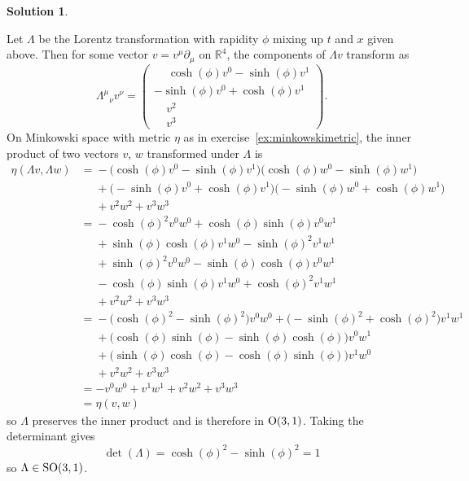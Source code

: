 \documentclass[11pt, a4paper]{report}
\theoremstyle{definition}
\newtheorem{solution}{Solution}[part]
\newenvironment{sol}{\begin{solution}}{\end{solution}\pagebreak[3]}
\renewcommand*{\O}{\ensuremath\text{O}}
\newcommand*{\SO}{\ensuremath\text{SO}}
\begin{document}
\begin{sol}\label{sol:so31lorentztransformations}

Let $\Lambda$ be the Lorentz transformation with rapidity $\phi$ mixing up $t$ and $x$ given above.
Then for some vector $v = v^\mu \partial_\mu$ on $\mathbb{R}^4$, the components of $\Lambda v$ transform as
\[
    {\Lambda^\mu}_\nu v^\nu = \begin{pmatrix}
        \!\phantom{-} \cosh(\phi) v^0 - \sinh(\phi) v^1 \\
        -\sinh(\phi) v^0 + \cosh(\phi) v^1 \\
        \;\;\;\; v^2 \\
        \;\;\;\; v^3
    \end{pmatrix}.
\]
On Minkowski space with metric $\eta$ as in exercise~\ref{ex:minkowskimetric}, the inner product of two vectors $v$, $w$ transformed under $\Lambda$ is
\begin{align*}
    \eta(\Lambda v, \Lambda w)
        &\mathrel{=}{} - \bigl(\cosh(\phi) v^0 - \sinh(\phi) v^1 \bigr)
            \bigl( \cosh(\phi) w^0 - \sinh(\phi) w^1 \bigr) \\
        &\mathrel{\phantom{=}}{} + \bigl(-\sinh(\phi) v^0 + \cosh(\phi) v^1 \bigr)
                                   \bigl(-\sinh(\phi) w^0 + \cosh(\phi) w^1 \bigr) \\
        &\mathrel{\phantom{=}}{} + v^2 w^2 + v^3 w^3 \\
        &\mathrel{=}{} - {\cosh(\phi)}^2 v^0 w^0 + \cosh(\phi) \sinh(\phi) v^0 w^1 \\
        &\mathrel{\phantom{=}}{} + \sinh(\phi) \cosh(\phi) v^1 w^0 - {\sinh(\phi)}^2 v^1 w^1 \\
        &\mathrel{\phantom{=}}{} + {\sinh(\phi)}^2 v^0 w^0 - \sinh(\phi) \cosh(\phi) v^0 w^1 \\
        &\mathrel{\phantom{=}}{} - \cosh(\phi) \sinh(\phi) v^1 w^0 + {\cosh(\phi)}^2 v^1 w^1 \\
        &\mathrel{\phantom{=}}{} + v^2 w^2 + v^3 w^3 \\
        &\mathrel{=}{} - \bigl( {\cosh(\phi)}^2 - {\sinh(\phi)}^2 \bigr) v^0 w^0
                       + \bigl( -{\sinh(\phi)}^2 + {\cosh(\phi)}^2) v^1 w^1 \\
        &\mathrel{\phantom{=}}{} + \bigl( \cosh(\phi) \sinh(\phi) - \sinh(\phi) \cosh(\phi) \bigr) v^0 w^1 \\
        &\mathrel{\phantom{=}}{} + \bigl( \sinh(\phi) \cosh(\phi) - \cosh(\phi) \sinh(\phi) \bigr) v^1 w^0 \\
        &\mathrel{\phantom{=}}{} + v^2 w^2 + v^3 w^3 \\
        &= - v^0 w^0 + v^1 w^1 + v^2 w^2 + v^3 w^3 \\
        &= \eta(v, w)
\end{align*}
so $\Lambda$ preserves the inner product and is therefore in $\O(3, 1)$.
Taking the determinant gives
\[
    \det(\Lambda) = {\cosh(\phi)}^2 - {\sinh(\phi)}^2 = 1
\]
so $\Lambda \in \SO(3, 1)$.


\end{sol}
\end{document}
